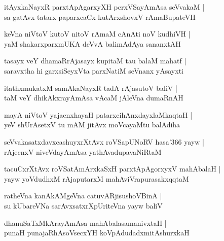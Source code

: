 \documentclass[twoside,12pt,openright]{book}
\newcounter{shloka}[chapter]
\begin{document}
\begin{shloka}%
itAyxkaNayxR parxtApAgarxyXH perxVSayAmAsa seVvakaM |\\
sa gatAvx tatarx paparxcaCx kutArxshovxV rAmaBupateVH
\end{shloka}

\begin{shloka}%
keVna niVtoV kutoV nitoV rAmaM cAnAti noV kudhiVH |\\
yaM shakarxparxmUKA deVvA balimAdAya sananxtAH 
\end{shloka}

\begin{shloka}%
tasayx veY dhamaRrAjasayx kupitaM tau balaM mahatf |\\
saravxtha hi garxsiSeyxVta parxNatiM seVnanx yAsayxti
\end{shloka}

\begin{shloka}%
itathxmukatxM samAkaNayxR tadA rAjasutoV baliV |\\
taM veY dhikAkxrayAmAsa vAcaM jAleVna dumaRnAH 
\end{shloka}

\begin{shloka}%
mayA niVtoV yajacnxhayaH patarxcihAnxdayxlaMkaqtaH |\\
yeV shUrAsetxV tu mAM jitAvx moVcayaMtu balAdiha 
\end{shloka}

\begin{shloka}%
seVvakasatxdavxcashuyxrXtAvx roVSapUNoRV hasa\char'366 yayw |\\
rAjecnxV niveVdayAmAsa yathAvadupavaNiRtaM 
\end{shloka}

\begin{shloka}%
tacuCxrXtAvx roVSatAmArxkaSxH parxtApAgorxyxV mahAbalaH |\\
yayw yoVdudhxM rAjaputarxM mahAviVrapurasakxqqtaM 
\end{shloka}

\begin{shloka}%
ratheVna kanAkAMgeVna catuvARjisushoVBinA |\\
su kUbareVNa sarAvxsatxrXpUriteVna yayw baliV 
\end{shloka}

\begin{shloka}%
dhanuSaTxMkArayAmAsa mahAbalasamanivxtaH |\\
punaH punajaRhAsoVsecxYH koVpAdudadxmitAshurxkaH 
\end{shloka}
\end{document}
